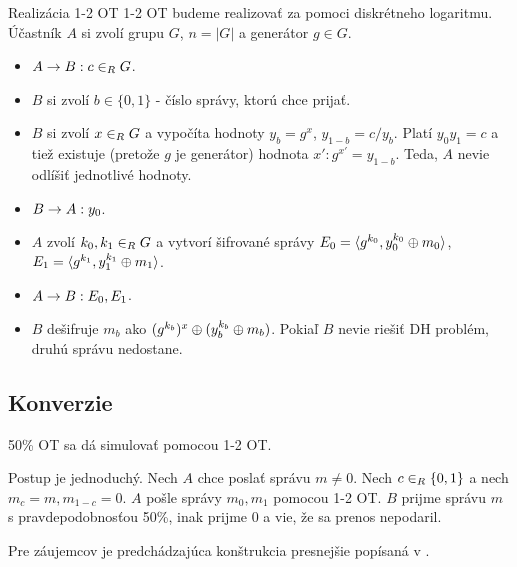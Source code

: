 \begin{priklad}{Realizácia 1-2 OT}
 1-2 OT budeme realizovať za pomoci diskrétneho logaritmu.
 Účastník $A$ si zvolí grupu $G$, $n=|G|$ a generátor $g\in G$.
 \begin{itemize}
    \compactlist
    \item $A \rightarrow B: c \in_{R} G$.
    \item $B$ si zvolí $b\in\{0,1\}$ - číslo správy, ktorú chce
    prijať.
    \item $B$ si zvolí $x \in_{R} G$ a vypočíta hodnoty $y_b = g^x$,
    $y_{1-b} = c/ y_b$. Platí $y_0 y_1 = c$ a tiež existuje (pretože
    $g$ je generátor) hodnota $x': g^{x'} = y_{1-b}$. Teda, $A$ nevie
    odlíšiť jednotlivé hodnoty.
    \item $B \rightarrow A: y_0$.
    \item $A$ zvolí $k_0,k_1 \in_{R} G$ a vytvorí šifrované správy 
    $E_0 = \langle g^{k_0}, y_0^{k_0} \oplus m_0 \rangle$,
    $E_1 = \langle g^{k_1}, y_1^{k_1} \oplus m_1 \rangle$.
    \item $A \rightarrow B: E_0, E_1$.
    \item $B$ dešifruje $m_b$ ako $(g^{k_b})^x \oplus (y_b ^ {k_b} \oplus
    m_b)$.
    Pokiaľ $B$ nevie riešiť DH problém, druhú správu nedostane.
 \end{itemize}
\end{priklad}

\subsection{Konverzie}

\begin{lema}
    50\% OT sa dá simulovať pomocou 1-2 OT.
\end{lema}
\begin{dokaz}
    Postup je jednoduchý. Nech $A$ chce poslať správu $m \ne 0$.
    Nech $c \in_{R} \{0,1\}$ a nech $m_c = m, m_{1-c} = 0$. $A$ pošle
    správy $m_0, m_1$ pomocou 1-2 OT. $B$ prijme správu $m$ s
    pravdepodobnosťou 50\%, inak prijme 0 a vie, že sa prenos
    nepodaril.
\end{dokaz}

Pre záujemcov je predchádzajúca konštrukcia presnejšie popísaná v
\cite{ot_equiv}.

